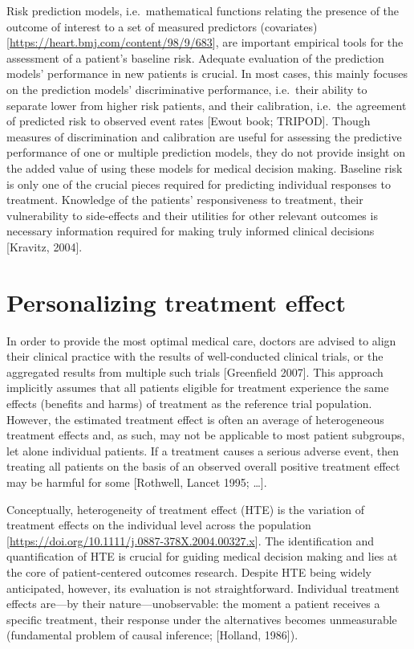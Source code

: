 \documentclass[
]{book}
\begin{document}
Risk prediction models, i.e.~mathematical functions relating the presence of the
outcome of interest to a set of measured predictors (covariates)
{[}\url{https://heart.bmj.com/content/98/9/683}{]}, are important empirical tools for the
assessment of a patient's baseline risk. Adequate evaluation of the prediction
models' performance in new patients is crucial. In most cases, this mainly
focuses on the prediction models' discriminative performance, i.e.~their ability
to separate lower from higher risk patients, and their calibration, i.e.~the
agreement of predicted risk to observed event rates {[}Ewout book; TRIPOD{]}. Though
measures of discrimination and calibration are useful for assessing the
predictive performance of one or multiple prediction models, they do not provide
insight on the added value of using these models for medical decision
making. Baseline risk is only one of the crucial pieces required for predicting
individual responses to treatment. Knowledge of the patients' responsiveness to
treatment, their vulnerability to side-effects and their utilities for other
relevant outcomes is necessary information required for making truly informed
clinical decisions {[}Kravitz, 2004{]}.

\hypertarget{personalizing-treatment-effect}{%
\section{Personalizing treatment effect}\label{personalizing-treatment-effect}}

In order to provide the most optimal medical care, doctors are advised to align
their clinical practice with the results of well-conducted clinical trials, or
the aggregated results from multiple such trials {[}Greenfield 2007{]}. This
approach implicitly assumes that all patients eligible for treatment experience
the same effects (benefits and harms) of treatment as the reference trial
population. However, the estimated treatment effect is often an average of
heterogeneous treatment effects and, as such, may not be applicable to most
patient subgroups, let alone individual patients. If a treatment causes a
serious adverse event, then treating all patients on the basis of an observed
overall positive treatment effect may be harmful for some {[}Rothwell, Lancet
1995; \ldots{]}.

Conceptually, heterogeneity of treatment effect (HTE) is the variation of
treatment effects on the individual level across the population
{[}\url{https://doi.org/10.1111/j.0887-378X.2004.00327.x}{]}. The identification and
quantification of HTE is crucial for guiding medical decision making and lies at the
core of patient-centered outcomes research. Despite HTE being widely
anticipated, however, its evaluation is not straightforward. Individual
treatment effects are---by their nature---unobservable: the moment a patient
receives a specific treatment, their response under the alternatives becomes
unmeasurable (fundamental problem of causal inference; {[}Holland, 1986{]}).
\end{document}
